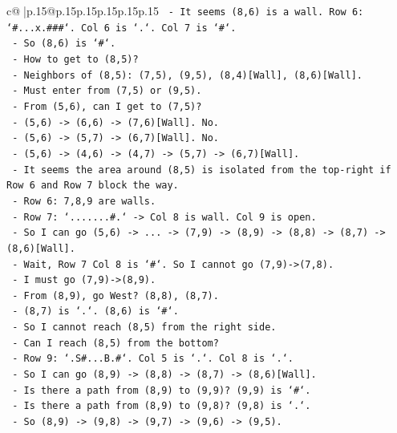 \documentclass{article}
\begin{document}
{\begin{supertabular}{c@{$\;$}|p{.15\linewidth}@{}p{.15\linewidth}p{.15\linewidth}p{.15\linewidth}p{.15\linewidth}p{.15\linewidth}}
{{{\texttt{    {-} It seems (8,6) is a wall. Row 6: `\#...x.\#\#\#`. Col 6 is `.`. Col 7 is `\#`.} \\
\texttt{    {-} So (8,6) is `\#`.} \\
\texttt{    {-} How to get to (8,5)?} \\
\texttt{    {-} Neighbors of (8,5): (7,5), (9,5), (8,4){[}Wall{]}, (8,6){[}Wall{]}.} \\
\texttt{    {-} Must enter from (7,5) or (9,5).} \\
\texttt{    {-} From (5,6), can I get to (7,5)?} \\
\texttt{    {-} (5,6) {-}> (6,6) {-}> (7,6){[}Wall{]}. No.} \\
\texttt{    {-} (5,6) {-}> (5,7) {-}> (6,7){[}Wall{]}. No.} \\
\texttt{    {-} (5,6) {-}> (4,6) {-}> (4,7) {-}> (5,7) {-}> (6,7){[}Wall{]}.} \\
\texttt{    {-} It seems the area around (8,5) is isolated from the top{-}right if Row 6 and Row 7 block the way.} \\
\texttt{    {-} Row 6: 7,8,9 are walls.} \\
\texttt{    {-} Row 7: `.......\#.` {-}> Col 8 is wall. Col 9 is open.} \\
\texttt{    {-} So I can go (5,6) {-}> ... {-}> (7,9) {-}> (8,9) {-}> (8,8) {-}> (8,7) {-}> (8,6){[}Wall{]}.} \\
\texttt{    {-} Wait, Row 7 Col 8 is `\#`. So I cannot go (7,9){-}>(7,8).} \\
\texttt{    {-} I must go (7,9){-}>(8,9).} \\
\texttt{    {-} From (8,9), go West? (8,8), (8,7).} \\
\texttt{    {-} (8,7) is `.`. (8,6) is `\#`.} \\
\texttt{    {-} So I cannot reach (8,5) from the right side.} \\
\texttt{    {-} Can I reach (8,5) from the bottom?} \\
\texttt{    {-} Row 9: `.S\#...B.\#`. Col 5 is `.`. Col 8 is `.`.} \\
\texttt{    {-} So I can go (8,9) {-}> (8,8) {-}> (8,7) {-}> (8,6){[}Wall{]}.} \\
\texttt{    {-} Is there a path from (8,9) to (9,9)? (9,9) is `\#`.} \\
\texttt{    {-} Is there a path from (8,9) to (9,8)? (9,8) is `.`.} \\
\texttt{    {-} So (8,9) {-}> (9,8) {-}> (9,7) {-}> (9,6) {-}> (9,5).} \\
}}}
\end{supertabular}}
\end{document}
